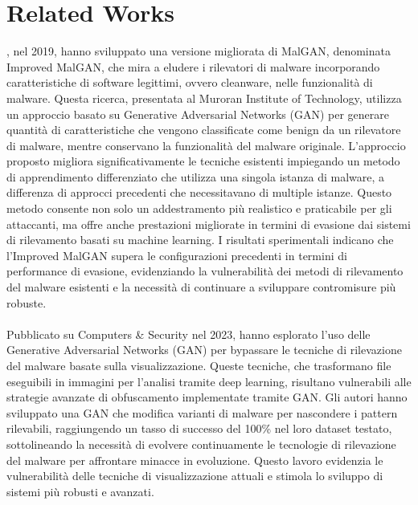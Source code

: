 \chapter{Related Works}
\label{cap:RelatedWorks}
\cite{article:migan}, nel 2019, hanno sviluppato una versione migliorata di MalGAN, denominata Improved MalGAN, che mira a eludere i rilevatori di malware incorporando caratteristiche di software legittimi, ovvero cleanware, nelle funzionalità di malware. Questa ricerca, presentata al Muroran Institute of Technology, utilizza un approccio basato su Generative Adversarial Networks (GAN) per generare quantità di caratteristiche che vengono classificate come benign da un rilevatore di malware, mentre conservano la funzionalità del malware originale. L'approccio proposto migliora significativamente le tecniche esistenti impiegando un metodo di apprendimento differenziato che utilizza una singola istanza di malware, a differenza di approcci precedenti che necessitavano di multiple istanze. Questo metodo consente non solo un addestramento più realistico e praticabile per gli attaccanti, ma offre anche prestazioni migliorate in termini di evasione dai sistemi di rilevamento basati su machine learning. I risultati sperimentali indicano che l'Improved MalGAN supera le configurazioni precedenti in termini di performance di evasione, evidenziando la vulnerabilità dei metodi di rilevamento del malware esistenti e la necessità di continuare a sviluppare contromisure più robuste.\\\\
Pubblicato su Computers \& Security nel 2023, \cite{article:computersecurity} hanno esplorato l'uso delle Generative Adversarial Networks (GAN) per bypassare le tecniche di rilevazione del malware basate sulla visualizzazione. Queste tecniche, che trasformano file eseguibili in immagini per l'analisi tramite deep learning, risultano vulnerabili alle strategie avanzate di obfuscamento implementate tramite GAN. Gli autori hanno sviluppato una GAN che modifica varianti di malware per nascondere i pattern rilevabili, raggiungendo un tasso di successo del 100\% nel loro dataset testato, sottolineando la necessità di evolvere continuamente le tecnologie di rilevazione del malware per affrontare minacce in evoluzione. Questo lavoro evidenzia le vulnerabilità delle tecniche di visualizzazione attuali e stimola lo sviluppo di sistemi più robusti e avanzati.\\\\
